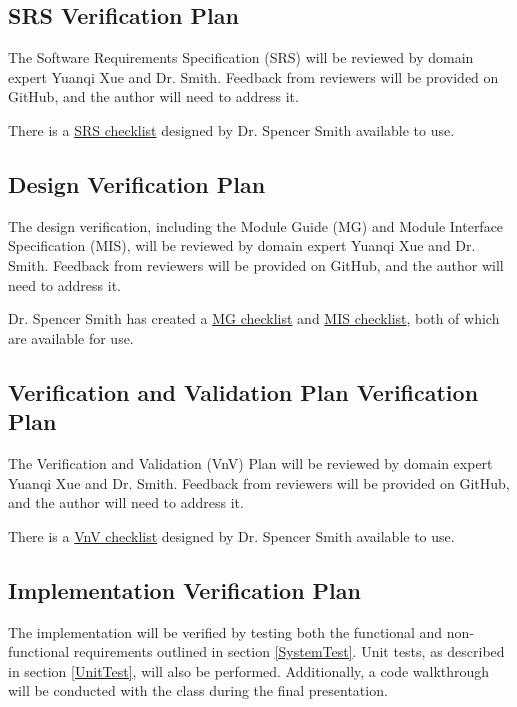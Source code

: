 \documentclass[12pt, titlepage]{article}
\begin{document}
\subsection{SRS Verification Plan}

The Software Requirements Specification (SRS) will be reviewed by domain expert Yuanqi Xue and Dr. Smith. Feedback from reviewers will be provided on GitHub, and the author will need to address it.

\noindent There is a \href{https://github.com/V-AS/Two-tower-recommender-system/blob/main/docs/Checklists/SRS-Checklist.pdf}{SRS checklist} designed by Dr. Spencer Smith available to use.

\subsection{Design Verification Plan}

The design verification, including the Module Guide (MG) and Module Interface Specification (MIS), will be reviewed by domain expert Yuanqi Xue and Dr. Smith. Feedback from reviewers will be provided on GitHub, and the author will need to address it.

\noindent Dr. Spencer Smith has created a \href{https://github.com/V-AS/Two-tower-recommender-system/blob/main/docs/Checklists/MG-Checklist.pdf}{MG checklist} and \href{https://github.com/V-AS/Two-tower-recommender-system/blob/main/docs/Checklists/MIS-Checklist.pdf}{MIS checklist}, both of which are available for use.

\subsection{Verification and Validation Plan Verification Plan}

The Verification and Validation (VnV) Plan will be reviewed by domain expert Yuanqi Xue and Dr. Smith. Feedback from reviewers will be provided on GitHub, and the author will need to address it.

\noindent  There is a \href{https://github.com/V-AS/Two-tower-recommender-system/blob/main/docs/Checklists/VnV-Checklist.pdf}{VnV checklist} designed by Dr. Spencer Smith available to use.
%

\subsection{Implementation Verification Plan}

The implementation will be verified by testing both the functional and non-functional requirements outlined in section \ref{SystemTest}. Unit tests, as described in section \ref{UnitTest}, will also be performed. Additionally, a code walkthrough will be conducted with the class during the final presentation.
\end{document}
